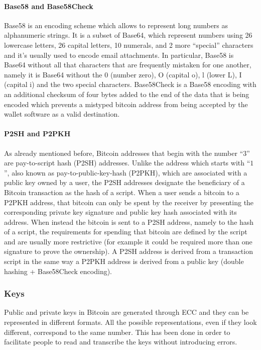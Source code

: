 \paragraph{Base58 and Base58Check} Base58 is an encoding scheme which allows to
represent long numbers as alphanumeric strings. It is a subset of Base64, which
represent numbers using 26 lowercase letters, 26 capital letters, 10 numerals,
and 2 more ``special'' characters and it's usually used to encode email
attachments. In particular, Base58 is Base64 without all that characters that
are frequently mistaken for one another, namely it is Base64 without the 0
(number zero), O (capital o), l (lower L), I (capital i) and the two special
characters. Base58Check is a Base58 encoding with an additional checksum of four
bytes added to the end of the data that is being encoded which prevents a
mistyped bitcoin address from being accepted by the wallet software as a valid
destination.


\paragraph{P2SH and P2PKH}  As already mentioned before, Bitcoin addresses that
begin with the number ``$3$'' are pay-to-script hash (P2SH) addresses. Unlike
the address which starts with ``$1$'', also known as pay-to-public-key-hash
(P2PKH), which are associated with a public key owned by a user, the P2SH
addresses designate the beneficiary of a Bitcoin transaction as the hash of a
script. When a user sends a bitcoin to a P2PKH address, that bitcoin can only
be spent by the receiver by presenting the corresponding private key signature
and public key hash associated with its address. When instead the bitcoin is sent to
a P2SH address, namely to the hash of a script, the requirements for spending that
bitcoin are defined by the script and are usually more restrictive (for example it
could be required more than one signature to prove the ownership). A P2SH address
is derived from a transaction script in the same way a P2PKH address is derived
from a public key (double hashing + Base58Check encoding).


\subsubsection{Keys}
Public and private keys in Bitcoin are generated through ECC and they can be
represented in different formats. All the possible representations, even if they
look different, correspond to the same number. This has been done in order to
facilitate people to read and transcribe the keys without introducing errors.

